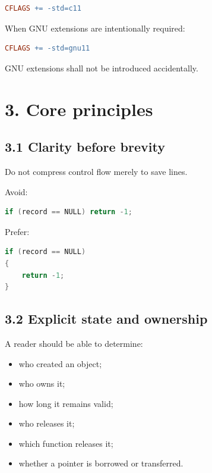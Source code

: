\documentclass[11pt,a4paper]{article}
\begin{document}
\begin{lstlisting}[language=make]
CFLAGS += -std=c11
\end{lstlisting}

When GNU extensions are intentionally required:

\begin{lstlisting}[language=make]
CFLAGS += -std=gnu11
\end{lstlisting}

GNU extensions shall not be introduced accidentally.

\section{3. Core principles}\label{3-core-principles}

\subsection{3.1 Clarity before brevity}\label{31-clarity-before-brevity}

Do not compress control flow merely to save lines.

Avoid:

\begin{lstlisting}[language=C]
if (record == NULL) return -1;
\end{lstlisting}

Prefer:

\begin{lstlisting}[language=C]
if (record == NULL)
{
    return -1;
}
\end{lstlisting}

\subsection{3.2 Explicit state and
ownership}\label{32-explicit-state-and-ownership}

A reader should be able to determine:

\begin{itemize}
\tightlist
\item
  who created an object;
\item
  who owns it;
\item
  how long it remains valid;
\item
  who releases it;
\item
  which function releases it;
\item
  whether a pointer is borrowed or transferred.
\end{itemize}
\end{document}
